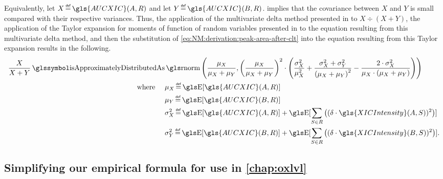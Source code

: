 Equivalently, let \(X \isdefinedas \gls{AUCXIC}(A, R)\) and let \(Y \isdefinedas \gls{AUCXIC}(B, R)\).
 implies that the covariance between \(X\) and \(Y\) is small compared with their respective variances. 
Thus, the application of the multivariate delta method presented in \cite{oehlert1992note} to \(X\div(X+Y)\),
	the application of the Taylor expansion for moments of function of random variables presented in \cite[Chapter 4]{lee2006analyzing} to the equation resulting from this multivariate delta method,
	and then the substitution of \cref{eq:NM:derivation:peak-area-after-clt} into the equation resulting from this Taylor expansion
		results in the following.
\begin{align}
\frac{X}{X + Y} \isappdistas &
\rnorm\left(
	\frac{\mu_X}{\mu_X+\mu_Y}, 
	\left(\frac{\mu_X}{\mu_X+\mu_Y}\right)^2 \cdot 
	\left(\frac{\sigma_X^2}{\mu_X^2} + \frac{\sigma_X^2+\sigma_Y^2}{\left(\mu_X+\mu_Y\right)^2} - 
	\frac{2\cdot\sigma_X^2}{\mu_X\cdot(\mu_X+\mu_Y)}\right)
\right) 
\label{eq:NM:derivation:fraction-normality} \\
	\text{where~~~~}
&\mu_X \isdefinedas    \E[\gls{AUCXIC}(A, R)] \\ 
&\mu_Y \isdefinedas    \E[\gls{AUCXIC}(B, R)] \\
&\sigma_X^2 \isdefinedas \E[\gls{AUCXIC}(A, R)] + \E[\sum_{S\in R}\left((\delta\cdot \gls{XICIntensity}(A,S))^2\right)] \\
&\sigma_Y^2 \isdefinedas \E[\gls{AUCXIC}(B, R)] + \E[\sum_{S\in R}\left((\delta\cdot \gls{XICIntensity}(B,S))^2\right)].
\end{align}		 
	
\subsection{\texorpdfstring{Simplifying our empirical formula for use in \cref{chap:oxlvl}}{Simplifying our empirical formula}}

